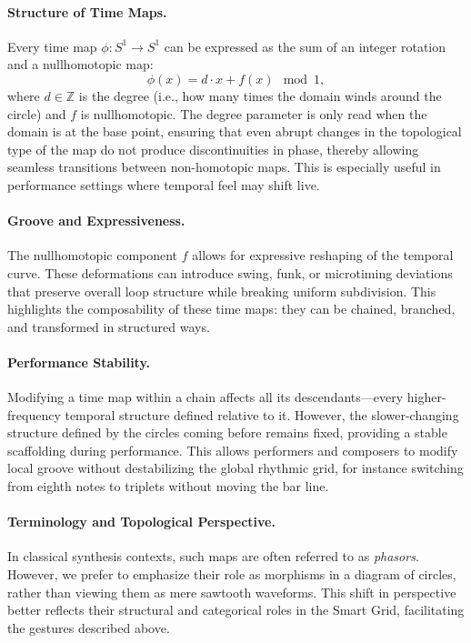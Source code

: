 \documentclass[12pt]{article}
\begin{document}
\paragraph{Structure of Time Maps.}  
Every time map $\phi: S^1 \to S^1$ can be expressed as the sum of an integer rotation and a nullhomotopic map:
\[
\phi(x) = d \cdot x + f(x) \mod 1,
\]
where $d \in \mathbb{Z}$ is the degree (i.e., how many times the domain winds around the circle) and $f$ is nullhomotopic.  
The degree parameter is only read when the domain is at the base point, ensuring that even abrupt changes in the topological type of the map do not produce discontinuities in phase, thereby allowing seamless transitions between non-homotopic maps.  
This is especially useful in performance settings where temporal feel may shift live.

\paragraph{Groove and Expressiveness.}  
The nullhomotopic component $f$ allows for expressive reshaping of the temporal curve.  
These deformations can introduce swing, funk, or microtiming deviations that preserve overall loop structure while breaking uniform subdivision.  
This highlights the composability of these time maps: they can be chained, branched, and transformed in structured ways.

\paragraph{Performance Stability.}  
Modifying a time map within a chain affects all its descendants—every higher-frequency temporal structure defined relative to it.  
However, the slower-changing structure defined by the circles coming before remains fixed, providing a stable scaffolding during performance.  
This allows performers and composers to modify local groove without destabilizing the global rhythmic grid, for instance switching from eighth notes to triplets without moving the bar line.

\paragraph{Terminology and Topological Perspective.}  
In classical synthesis contexts, such maps are often referred to as \emph{phasors}.  
However, we prefer to emphasize their role as morphisms in a diagram of circles, rather than viewing them as mere sawtooth waveforms.  
This shift in perspective better reflects their structural and categorical roles in the Smart Grid, facilitating the gestures described above.
\end{document}
